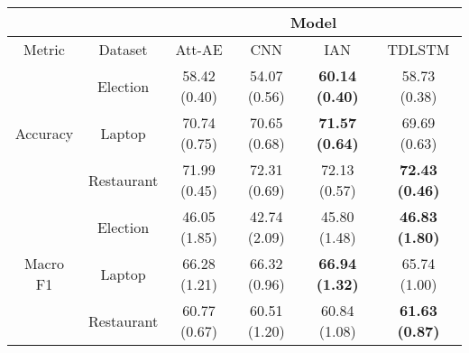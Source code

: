\begin{tabular}{|c|c|c|c|c|c|}
\hline
&  &        \multicolumn{4}{c|}{Model} \\
\hline
Metric & Dataset &     Att-AE &           CNN &           IAN &        TDLSTM   \\
\hline
\multirow{3}{*}{Accuracy} & Election &  58.42 (0.40) &  54.07 (0.56) &  \textbf{60.14 (0.40)} &  58.73 (0.38) \\
& Laptop &  70.74 (0.75) &  70.65 (0.68) &  \textbf{71.57 (0.64)} &  69.69 (0.63) \\
& Restaurant &  71.99 (0.45) &  72.31 (0.69) &  72.13 (0.57) &  \textbf{72.43 (0.46)} \\
\hline
\multirow{3}{*}{Macro F1} & Election &  46.05 (1.85) &  42.74 (2.09) &  45.80 (1.48) &  \textbf{46.83 (1.80)} \\
& Laptop &  66.28 (1.21) &  66.32 (0.96) &  \textbf{66.94 (1.32)} &  65.74 (1.00) \\
& Restaurant &  60.77 (0.67) &  60.51 (1.20) &  60.84 (1.08) &  \textbf{61.63 (0.87)} \\
\hline
\end{tabular}